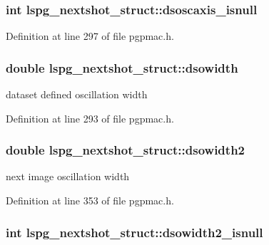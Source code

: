 \hypertarget{structlspg__nextshot__struct_a51a26391afcacfb4c946fb9e8e9ab6b0}{
\subsubsection[{dsoscaxis\-\_\-isnull}]{\setlength{\rightskip}{0pt plus 5cm}int lspg\-\_\-nextshot\-\_\-struct\-::dsoscaxis\-\_\-isnull}}\label{structlspg__nextshot__struct_a51a26391afcacfb4c946fb9e8e9ab6b0}


Definition at line 297 of file pgpmac.\-h.

\hypertarget{structlspg__nextshot__struct_ad5a8f568a04aa6a13767933062b28f19}{
\subsubsection[{dsowidth}]{\setlength{\rightskip}{0pt plus 5cm}double lspg\-\_\-nextshot\-\_\-struct\-::dsowidth}}\label{structlspg__nextshot__struct_ad5a8f568a04aa6a13767933062b28f19}


dataset defined oscillation width 



Definition at line 293 of file pgpmac.\-h.

\hypertarget{structlspg__nextshot__struct_a5378e13735a5392a9fcd853ce8c9e929}{
\subsubsection[{dsowidth2}]{\setlength{\rightskip}{0pt plus 5cm}double lspg\-\_\-nextshot\-\_\-struct\-::dsowidth2}}\label{structlspg__nextshot__struct_a5378e13735a5392a9fcd853ce8c9e929}


next image oscillation width 



Definition at line 353 of file pgpmac.\-h.

\hypertarget{structlspg__nextshot__struct_a5ffd27b8063506fd54162658e5c2ce8a}{
\subsubsection[{dsowidth2\-\_\-isnull}]{\setlength{\rightskip}{0pt plus 5cm}int lspg\-\_\-nextshot\-\_\-struct\-::dsowidth2\-\_\-isnull}}\label{structlspg__nextshot__struct_a5ffd27b8063506fd54162658e5c2ce8a}


